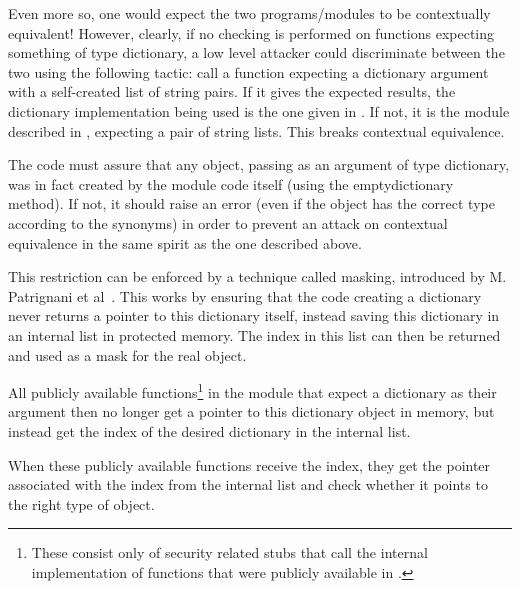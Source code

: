 Even more so, one would expect the two programs/modules to be contextually equivalent! However, clearly, if no checking is performed on functions expecting something of type dictionary, a low level attacker could discriminate between the two using the following tactic: call a function expecting a dictionary argument with a self-created list of string pairs. If it gives the expected results, the dictionary implementation being used is the one given in . If not, it is the module described in , expecting a pair of string lists. This breaks contextual equivalence.

The code must assure that any object, passing as an argument of type dictionary, was in fact created by the module code itself (using the emptydictionary method). If not, it should raise an error (even if the object has the correct type according to the synonyms) in order to prevent an attack on contextual equivalence in the same spirit as the one described above.

This restriction can be enforced by a technique called masking, introduced by M. Patrignani et al~\cite{Patrignani}. 
This works by ensuring that the code creating a dictionary never returns a pointer to this dictionary itself, instead saving this dictionary in an internal list in protected memory.
The index in this list can then be returned and used as a mask for the real object.

All publicly available functions\footnote{These consist only of security related stubs that call the internal implementation of functions that were publicly available in \MiniML.} in the module that expect a dictionary as their argument then no longer get a pointer to this dictionary object in memory, but instead get the index of the desired dictionary in the internal list.

When these publicly available functions receive the index, they get the pointer associated with the index from the internal list and check whether it points to the right type of object.



